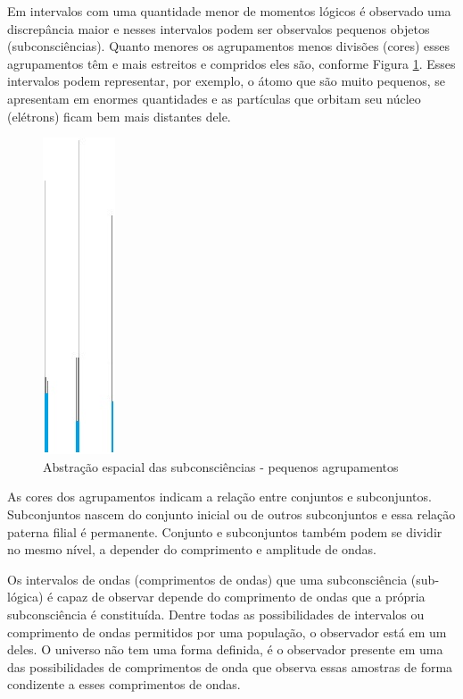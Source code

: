 Em intervalos com uma quantidade menor de momentos lógicos é observado uma discrepância maior e nesses intervalos podem ser observalos pequenos objetos (subconsciências). Quanto menores os agrupamentos menos divisões (cores) esses agrupamentos têm e mais estreitos e compridos eles são, conforme Figura \ref{fig:consciousness_space_subconsciousness_min}. Esses intervalos podem representar, por exemplo, o átomo que são muito pequenos, se apresentam em enormes quantidades e as partículas que orbitam seu núcleo (elétrons) ficam bem mais distantes dele.
	\begin{figure}[H]
	\caption{Abstração espacial das subconsciências - pequenos agrupamentos}
	\label{fig:consciousness_space_subconsciousness_min}
	\centering
	\includegraphics[scale=.7]{sections/images/consciousness_space_subconsciousness_min.jpg}
	\end{figure}
	
As cores dos agrupamentos indicam a relação entre conjuntos e subconjuntos. Subconjuntos nascem do conjunto inicial ou de outros subconjuntos e essa relação paterna filial é permanente. Conjunto e subconjuntos também podem se dividir no mesmo nível, a depender do comprimento e amplitude de ondas.

Os intervalos de ondas (comprimentos de ondas) que uma subconsciência (sub-lógica) é capaz de observar depende do comprimento de ondas que a própria subconsciência é constituída. Dentre todas as possibilidades de intervalos ou comprimento de ondas permitidos por uma população, o observador está em um deles. O universo não tem uma forma definida, é o observador presente em uma das possibilidades de comprimentos de onda que observa essas amostras de forma condizente a esses comprimentos de ondas. 

